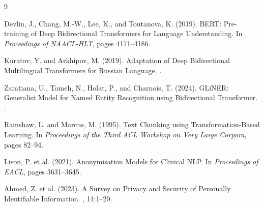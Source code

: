 \documentclass{article}
\begin{document}
\begin{thebibliography}{9}

Devlin, J., Chang, M.-W., Lee, K., and Toutanova, K. (2019).
\newblock BERT: Pre-training of Deep Bidirectional Transformers for Language Understanding.
\newblock In {\em Proceedings of NAACL-HLT}, pages 4171--4186.

Kuratov, Y. and Arkhipov, M. (2019).
\newblock Adaptation of Deep Bidirectional Multilingual Transformers for Russian Language.
.

Zaratiana, U., Tomeh, N., Holat, P., and Charnois, T. (2024).
\newblock GLiNER: Generalist Model for Named Entity Recognition using Bidirectional Transformer.
.

Ramshaw, L. and Marcus, M. (1995).
\newblock Text Chunking using Transformation-Based Learning.
\newblock In {\em Proceedings of the Third ACL Workshop on Very Large Corpora}, pages 82--94.

Lison, P. et al. (2021).
\newblock Anonymisation Models for Clinical NLP.
\newblock In {\em Proceedings of EACL}, pages 3631--3645.

Ahmed, Z. et al. (2023).
\newblock A Survey on Privacy and Security of Personally Identifiable Information.
, 11:1--20.

\end{thebibliography}
\end{document}
